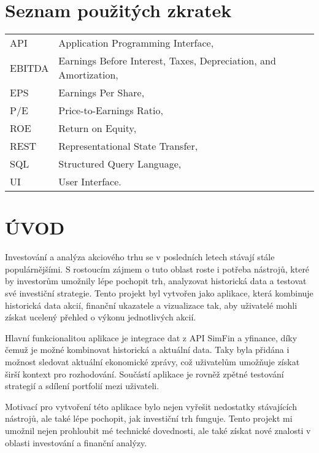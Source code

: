\documentclass[12pt, a4paper]{report}
\begin{document}
\chapter*{Seznam použitých zkratek}
\begin{tabular}{ll}
API & Application Programming Interface,\\
EBITDA & Earnings Before Interest, Taxes, Depreciation, and Amortization,\\
EPS & Earnings Per Share,\\
P/E & Price-to-Earnings Ratio,\\
ROE & Return on Equity,\\
REST & Representational State Transfer,\\
SQL & Structured Query Language,\\
UI & User Interface.\\
\end{tabular}

\newcommand{\introsubheading}[1]{%
  {\noindent\textbf{\normalsize #1}\vspace{1pt}\par}%
}

\chapter*{ÚVOD}

Investování a analýza akciového trhu se v posledních letech stávají stále populárnějšími. S rostoucím zájmem o tuto oblast roste i potřeba nástrojů, které by investorům umožnily lépe pochopit trh, analyzovat historická data a testovat své investiční strategie. Tento projekt byl vytvořen jako aplikace, která kombinuje historická data akcií, finanční ukazatele a vizualizace tak, aby uživatelé mohli získat ucelený přehled o výkonu jednotlivých akcií.

Hlavní funkcionalitou aplikace je integrace dat z API SimFin a yfinance, díky čemuž je možné kombinovat historická a aktuální data. Taky byla přidána i možnost sledovat aktuální ekonomické zprávy, což uživatelům umožňuje získat širší kontext pro rozhodování. Součástí aplikace je rovněž zpětné testování strategií a sdílení portfolií mezi uživateli.

Motivací pro vytvoření této aplikace bylo nejen vyřešit nedostatky stávajících nástrojů, ale také lépe pochopit, jak investiční trh funguje. Tento projekt mi umožnil nejen prohloubit mé technické dovednosti, ale také získat nové znalosti v oblasti investování a finanční analýzy.
\end{document}
